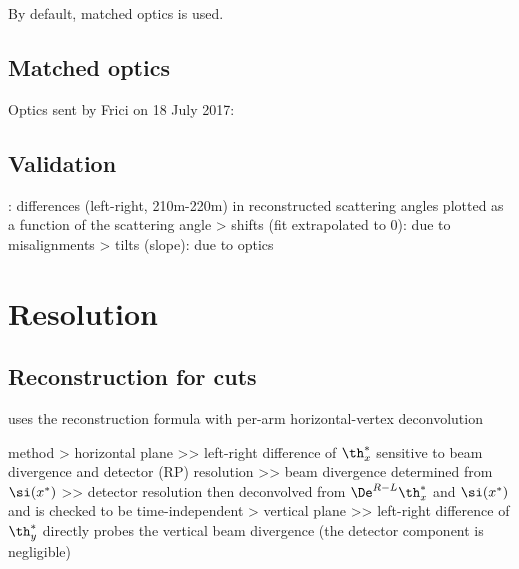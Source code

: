 By default, matched optics is used.

\subsection{Matched optics}

Optics sent by Frici on 18 July 2017:

\centerline{\vbox{}}

\subsection{Validation}

\> : differences (left-right, 210m-220m) in reconstructed scattering angles plotted as a function of the scattering angle
\>> shifts (fit extrapolated to 0): due to misalignments
\>> tilts (slope): due to optics



\section{Resolution}

\subsection{Reconstruction for cuts}

\> uses the reconstruction formula with per-arm horizontal-vertex deconvolution

\> method
\>> horizontal plane
\>>> left-right difference of $\th_x^*$ sensitive to beam divergence and detector (RP) resolution
\>>> beam divergence determined from $\si(x^*)$
\>>> detector resolution then deconvolved from $\De^{R-L} \th_x^*$ and $\si(x^*)$ and is checked to be time-independent
\>> vertical plane
\>>> left-right difference of $\th_y^*$ directly probes the vertical beam divergence (the detector component is negligible)

